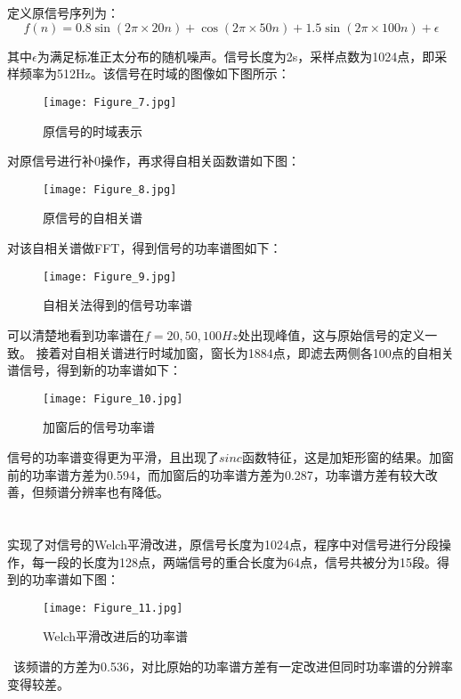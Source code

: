 \documentclass[12pt]{ctexart}
\begin{document}
    \section{}
    定义原信号序列为：
    \begin{equation*}
        f(n) = 0.8\sin(2\pi\times 20n) + \cos(2\pi\times 50n) + 1.5\sin(2\pi\times 100n) + \epsilon
    \end{equation*} \par
    其中$\epsilon$为满足标准正太分布的随机噪声。信号长度为2s，采样点数为1024点，即采样频率为512Hz。该信号在时域的图像如下图所示：
    \begin{figure}[H]
        \centering
        \texttt{[image: Figure\_7.jpg]}
        \caption{原信号的时域表示}
    \end{figure}
    对原信号进行补0操作，再求得自相关函数谱如下图：
    \begin{figure}[H]
        \centering
        \texttt{[image: Figure\_8.jpg]}
        \caption{原信号的自相关谱}
    \end{figure} \par
    对该自相关谱做FFT，得到信号的功率谱图如下：
    \begin{figure}[H]
        \centering
        \texttt{[image: Figure\_9.jpg]}
        \caption{自相关法得到的信号功率谱}
    \end{figure} \par
    可以清楚地看到功率谱在$f=20,50,100Hz$处出现峰值，这与原始信号的定义一致。
    接着对自相关谱进行时域加窗，窗长为1884点，即滤去两侧各100点的自相关谱信号，得到新的功率谱如下：
    \begin{figure}[H]
        \centering
        \texttt{[image: Figure\_10.jpg]}
        \caption{加窗后的信号功率谱}
    \end{figure} \par
    信号的功率谱变得更为平滑，且出现了$sinc$函数特征，这是加矩形窗的结果。加窗前的功率谱方差为0.594，而加窗后的功率谱方差为0.287，功率谱方差有较大改善，但频谱分辨率也有降低。

    \section{}
    实现了对信号的Welch平滑改进，原信号长度为1024点，程序中对信号进行分段操作，每一段的长度为128点，两端信号的重合长度为64点，信号共被分为15段。得到的功率谱如下图：
    \begin{figure}[H]
        \centering
        \texttt{[image: Figure\_11.jpg]}
        \caption{Welch平滑改进后的功率谱}
    \end{figure} \
    该频谱的方差为0.536，对比原始的功率谱方差有一定改进但同时功率谱的分辨率变得较差。
\end{document}
